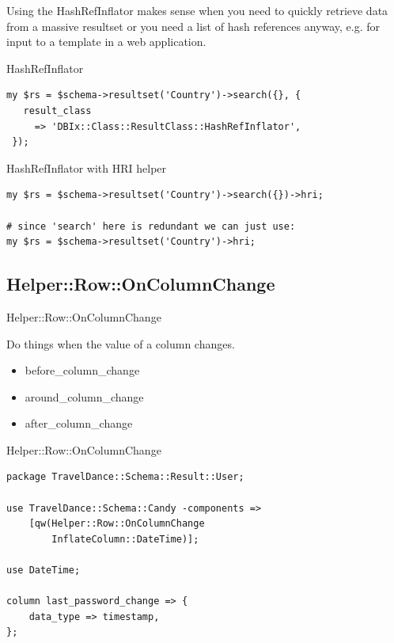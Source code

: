 Using the HashRefInflator makes sense when you need to quickly retrieve
data from a massive resultset or you need a list of hash references anyway,
e.g. for input to a template in a web application.

\begin{frame}[fragile]{HashRefInflator}
\begin{lstlisting}
my $rs = $schema->resultset('Country')->search({}, {
   result_class
     => 'DBIx::Class::ResultClass::HashRefInflator',
 });
\end{lstlisting}
\end{frame}

\begin{frame}[fragile]{HashRefInflator with HRI helper}
\begin{lstlisting}
my $rs = $schema->resultset('Country')->search({})->hri;

# since 'search' here is redundant we can just use:
my $rs = $schema->resultset('Country')->hri;
\end{lstlisting}
\end{frame}

\subsection{Helper::Row::OnColumnChange}

\begin{frame}[fragile]{Helper::Row::OnColumnChange}

Do things when the value of a column changes.

\begin{itemize}
\item before\_column\_change
\item around\_column\_change
\item after\_column\_change
\end{itemize}

\end{frame}

\begin{frame}[fragile]{Helper::Row::OnColumnChange}

\begin{lstlisting}
package TravelDance::Schema::Result::User;

use TravelDance::Schema::Candy -components =>
    [qw(Helper::Row::OnColumnChange 
        InflateColumn::DateTime)];

use DateTime;

column last_password_change => {
    data_type => timestamp,
};
\end{lstlisting}
\end{frame}

